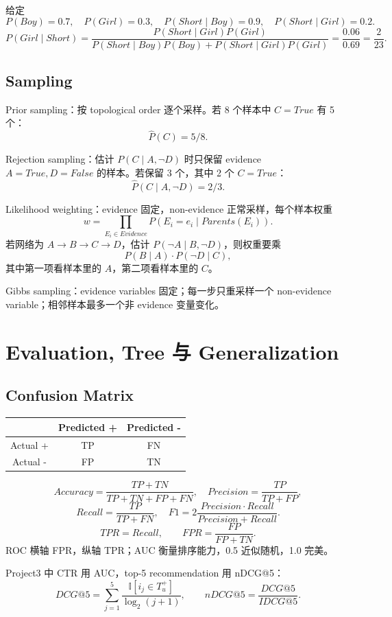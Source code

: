 \documentclass[UTF8,11pt,a4paper]{ctexart}
\begin{document}
给定
\[
P(Boy)=0.7,\quad P(Girl)=0.3,\quad
P(Short\mid Boy)=0.9,\quad P(Short\mid Girl)=0.2.
\]
\[
P(Girl\mid Short)=
\frac{P(Short\mid Girl)P(Girl)}
{P(Short\mid Boy)P(Boy)+P(Short\mid Girl)P(Girl)}
=\frac{0.06}{0.69}=\frac{2}{23}.
\]

\subsection{Sampling}

Prior sampling：按 topological order 逐个采样。若 8 个样本中 $C=True$ 有 5 个：
\[
\hat P(C)=5/8.
\]

Rejection sampling：估计 $P(C\mid A,\neg D)$ 时只保留 evidence $A=True,D=False$ 的样本。若保留 3 个，其中 2 个 $C=True$：
\[
\hat P(C\mid A,\neg D)=2/3.
\]

Likelihood weighting：evidence 固定，non-evidence 正常采样，每个样本权重
\[
w=\prod_{E_i\in Evidence}P(E_i=e_i\mid Parents(E_i)).
\]
若网络为 $A\to B\to C\to D$，估计 $P(\neg A\mid B,\neg D)$，则权重要乘
\[
P(B\mid A)\cdot P(\neg D\mid C),
\]
其中第一项看样本里的 $A$，第二项看样本里的 $C$。

Gibbs sampling：evidence variables 固定；每一步只重采样一个 non-evidence variable；相邻样本最多一个非 evidence 变量变化。

\section{Evaluation, Tree 与 Generalization}

\subsection{Confusion Matrix}

\begin{center}
\begin{tabular}{c|cc}
 & Predicted + & Predicted -\\
\hline
Actual + & TP & FN\\
Actual - & FP & TN
\end{tabular}
\end{center}

\[
Accuracy=\frac{TP+TN}{TP+TN+FP+FN},\quad
Precision=\frac{TP}{TP+FP},
\]
\[
Recall=\frac{TP}{TP+FN},\quad
F1=2\frac{Precision\cdot Recall}{Precision+Recall}.
\]
\[
TPR=Recall,\qquad FPR=\frac{FP}{FP+TN}.
\]
ROC 横轴 FPR，纵轴 TPR；AUC 衡量排序能力，0.5 近似随机，1.0 完美。

Project3 中 CTR 用 AUC，top-5 recommendation 用 nDCG@5：
\[
DCG@5=\sum_{j=1}^5\frac{\mathbb{I}[i_j\in T_u^+]}{\log_2(j+1)},\qquad
nDCG@5=\frac{DCG@5}{IDCG@5}.
\]
\end{document}
